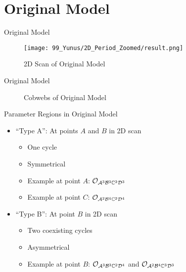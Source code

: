 
\section{Original Model}

\begin{frame}{Original Model}
	\begin{figure}
		\centering
		\texttt{[image: 99\_Yunus/2D\_Period\_Zoomed/result.png]}
		\caption{2D Scan of Original Model}
	\end{figure}
\end{frame}

\begin{frame}{Original Model}
	\begin{figure}
		\centering
		\caption{Cobwebs of Original Model}
	\end{figure}
\end{frame}

\begin{frame}{Parameter Regions in Original Model}
	\begin{itemize}
		\item ``Type A'': At points $A$ and $B$ in 2D scan
		      \begin{itemize}
			      \item One cycle
			      \item Symmetrical
			      \item Example at point $A$: $\mathcal{O}_{\mathcal{A}^3\mathcal{B}^3\mathbb{C}^3\mathcal{D}^3}$
			      \item Example at point $C$: $\mathcal{O}_{\mathcal{A}^2\mathcal{B}^4\mathbb{C}^2\mathcal{D}^4}$ \vspace*{1em}
		      \end{itemize}
		\item ``Type B'': At point $B$ in 2D scan
		      \begin{itemize}
			      \item Two coexisting cycles
			      \item Asymmetrical
			      \item Example at point $B$: $\mathcal{O}_{\mathcal{A}^3\mathcal{B}^3\mathbb{C}^2\mathcal{D}^4}$ and $\mathcal{O}_{\mathcal{A}^2\mathcal{B}^4\mathbb{C}^3\mathcal{D}^3}$
		      \end{itemize}
	\end{itemize}
\end{frame}

